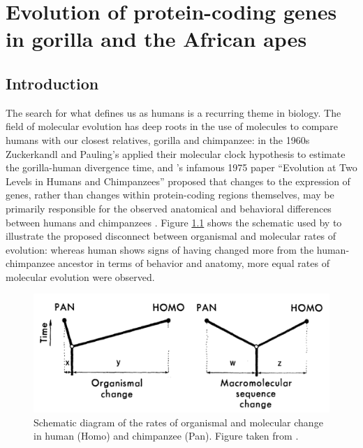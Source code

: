 \chapter{Evolution of protein-coding genes in gorilla and the African apes}
\label{ch_gorilla}

\section{Introduction}

The search for what defines us as humans is a recurring theme in
biology. The field of molecular evolution has deep roots in the use of
molecules to compare humans with our closest relatives, gorilla and
chimpanzee: in the 1960s Zuckerkandl and Pauling's applied their
molecular clock hypothesis to estimate the gorilla-human divergence
time, and \citeauthor{King1975}'s infamous 1975 paper ``Evolution at
Two Levels in Humans and Chimpanzees'' proposed that changes to the
expression of genes, rather than changes within protein-coding regions
themselves, may be primarily responsible for the observed anatomical
and behavioral differences between humans and chimpanzees
\citep{King1975}. Figure \ref{fig_king_wilson} shows the schematic
used by \citeauthor{King1975} to illustrate the proposed disconnect
between organismal and molecular rates of evolution: whereas human
shows signs of having changed more from the human-chimpanzee ancestor
in terms of behavior and anatomy, more equal rates of molecular
evolution were observed.

\begin{figure}
\centering
\includegraphics[scale=0.35]{Figs/king_wilson.pdf}
\caption{Schematic diagram of the rates of organismal and molecular
  change in human (Homo) and chimpanzee (Pan). Figure taken from
  \citet{King1975}.}
\label{fig_king_wilson}
\end{figure}


